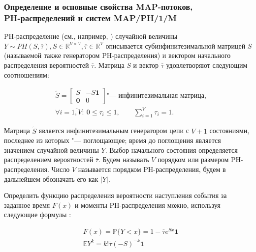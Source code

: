 \subsubsection{Определение и основные свойства MAP-потоков, \\PH-распределений и систем MAP/PH/1/M}


PH-распределение (см., например, \cite{Buchholz2014,VishnevskyDudin2018}) случайной величины $Y \sim  PH(S, \overline{\tau}), S \in \mathbb{R}^{V \times V}, \overline{\tau} \in \mathbb{R}^V$ описывается субинфинитезимальной матрицей $S$ (называемой также генератором PH-распределения) и вектором начального распределения вероятностей $\overline{\tau}$. Матрица $S$ и вектор $\overline{\tau}$ удовлетворяют следующим соотношениям:

\begin{equation}
	\label{eq:ch4-ph-def}
	\begin{aligned}
		&\tilde{S} = \begin{bmatrix}
			S  & -S\mathbf{1} \\
			\mathbf{0} &  0
		\end{bmatrix} \mbox{"--- инфинитезимальная матрица,}\\
		&\forall i = \overline{1,V}: \: 0 \leq \tau_i \leq 1, \qquad
			\sum\limits_{i=1}^{V} \tau_i = 1.
	\end{aligned}
\end{equation}


Матрица $\tilde{S}$ является инфинитезимальным генератором цепи с $V+1$ состояниями, последнее из которых "--- поглощающее; время до поглощения является значением случайной величины $Y$. Выбор начального состояния определяется распределением вероятностей $\overline{\tau}$. Будем называть $V$ порядком или размером PH-распределения. Число $V$ называется порядком PH-распределения, будем в дальнейшем обозначать его как $|Y|$.

Определить функцию распределения вероятности наступления события за заданное время $F(x)$ и моменты PH-распределения можно, используя следующие формулы \cite{VishnevskyDudin2018,Horvath2013}:

\begin{equation}
	\label{eq:ch4-ph-props}
	\begin{aligned}
		&F(x) = \mathbb{P}\{Y < x\} = 1 - \overline{\tau} e^{Sx} \mathbf{1}\\
		&\mathbb{E}Y^k = k! \overline{\tau} (-S)^{-k} \mathbf{1}
	\end{aligned}
\end{equation}



